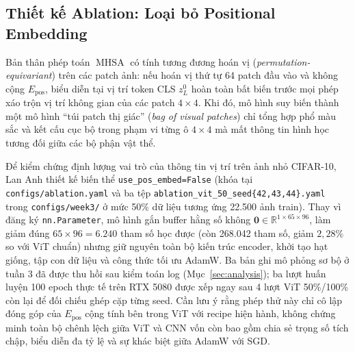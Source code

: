 \subsection{Thiết kế Ablation: Loại bỏ Positional Embedding}
Bản thân phép toán $\operatorname{MHSA}$ có tính tương đương hoán vị (\textit{permutation-equivariant}) trên các patch ảnh: nếu hoán vị thứ tự 64 patch đầu vào và không cộng $E_{\text{pos}}$, biểu diễn tại vị trí token CLS $z_L^0$ hoàn toàn bất biến trước mọi phép xáo trộn vị trí không gian của các patch $4\times4$. Khi đó, mô hình suy biến thành một mô hình ``túi patch thị giác'' (\textit{bag of visual patches}) chỉ tổng hợp phổ màu sắc và kết cấu cục bộ trong phạm vi từng ô $4\times4$ mà mất thông tin hình học tương đối giữa các bộ phận vật thể.

Để kiểm chứng định lượng vai trò của thông tin vị trí trên ảnh nhỏ CIFAR-10, Lan Anh thiết kế biến thể \texttt{use\_pos\_embed=False} (khóa tại \texttt{configs/ablation.yaml} và ba tệp \texttt{ablation\_vit\_50\_seed\{42,43,44\}.yaml} trong \texttt{configs/week3/} ở mức 50\% dữ liệu tương ứng 22.500 ảnh train). Thay vì đăng ký \texttt{nn.Parameter}, mô hình gắn buffer hằng số không $\mathbf{0}\in\mathbb{R}^{1\times65\times96}$, làm giảm đúng $65\times96=6.240$ tham số học được (còn 268.042 tham số, giảm $2{,}28\%$ so với ViT chuẩn) nhưng giữ nguyên toàn bộ kiến trúc encoder, khởi tạo hạt giống, tập con dữ liệu và công thức tối ưu AdamW. Ba bản ghi mô phỏng sơ bộ ở tuần 3 đã được thu hồi sau kiểm toán log (Mục~\ref{sec:analysis}); ba lượt huấn luyện 100 epoch thực tế trên RTX 5080 được xếp ngay sau 4 lượt ViT 50\%/100\% còn lại để đối chiếu ghép cặp từng seed. Cần lưu ý rằng phép thử này chỉ cô lập đóng góp của $E_{\text{pos}}$ cộng tính bên trong ViT với recipe hiện hành, không chứng minh toàn bộ chênh lệch giữa ViT và CNN vốn còn bao gồm chia sẻ trọng số tích chập, biểu diễn đa tỷ lệ và sự khác biệt giữa AdamW với SGD.
